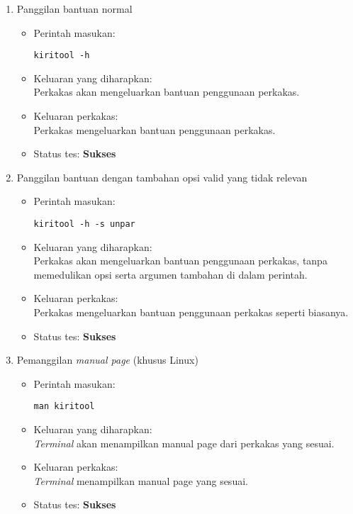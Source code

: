 \begin{enumerate}
	\item Panggilan bantuan normal
	\begin{itemize}
		\item Perintah masukan:
		\begin{verbatim}
kiritool -h
		\end{verbatim}
		\item Keluaran yang diharapkan: \\
		Perkakas akan mengeluarkan bantuan penggunaan perkakas.
		\item Keluaran perkakas: \\
		Perkakas mengeluarkan bantuan penggunaan perkakas.
		\item Status tes: \textbf{Sukses}
	\end{itemize}
	
	\item Panggilan bantuan dengan tambahan opsi valid yang tidak relevan
	\begin{itemize}
		\item Perintah masukan:
		\begin{verbatim}
kiritool -h -s unpar
		\end{verbatim}
		\item Keluaran yang diharapkan: \\
		Perkakas akan mengeluarkan bantuan penggunaan perkakas, tanpa memedulikan opsi serta argumen tambahan di dalam perintah.
		\item Keluaran perkakas: \\
		Perkakas mengeluarkan bantuan penggunaan perkakas seperti biasanya.
		\item Status tes: \textbf{Sukses}
	\end{itemize}
	
	\item Pemanggilan \textit{manual page} (khusus Linux)
	\begin{itemize}
		\item Perintah masukan:
		\begin{verbatim}
man kiritool
		\end{verbatim}
		\item Keluaran yang diharapkan: \\
		\textit{Terminal} akan menampilkan manual page dari perkakas yang sesuai.
		\item Keluaran perkakas: \\
		\textit{Terminal} menampilkan manual page yang sesuai.
		\item Status tes: \textbf{Sukses}
	\end{itemize}

\end{enumerate}

